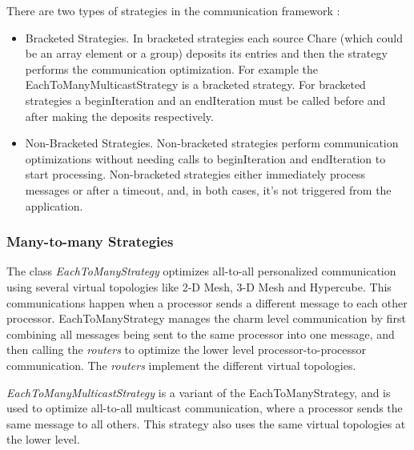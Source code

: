 {There are two types of strategies in the communication framework :

\begin{itemize}

\item Bracketed Strategies. In bracketed strategies each source Chare
(which could be an array element or a group) deposits its entries and then the
strategy performs the communication optimization. For example the
EachToManyMulticastStrategy is a bracketed strategy. For bracketed strategies a
beginIteration and an endIteration must be called before and after making the
deposits respectively.

\item Non-Bracketed Strategies. Non-bracketed strategies perform communication
optimizations without needing calls to beginIteration and endIteration to start
processing. Non-bracketed strategies either immediately process messages or
after a timeout, and, in both cases, it's not triggered from the application.

\end{itemize}

\subsubsection{Many-to-many Strategies}

The class {\em EachToManyStrategy} optimizes all-to-all personalized
communication using several virtual topologies like 2-D Mesh, 3-D Mesh and
Hypercube. This communications happen when a processor sends a different message
to each other processor. EachToManyStrategy manages the charm level
communication by first combining all messages being sent to the same processor
into one message, and then calling the {\em routers} to optimize the lower level
processor-to-processor communication. The {\em routers} implement the different
virtual topologies.


{\em EachToManyMulticastStrategy} is a variant of the EachToManyStrategy, and is
used to optimize all-to-all multicast communication, where a processor sends the
same message to all others. This strategy also uses the same virtual topologies
at the lower level.

}
